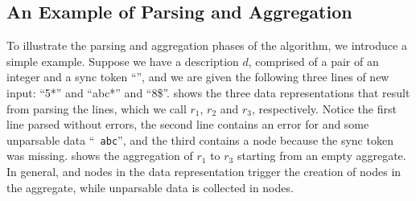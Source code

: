 





\subsection{An Example of Parsing and Aggregation}
To illustrate the parsing and aggregation phases of the algorithm, we
introduce a simple example.
Suppose we have a description $d$, comprised of a pair of an integer and a sync token ``\cd{*}'',
and we are given the following three lines of new input: ``5*'' and
``abc*'' and ``8\$''.
 shows the three data representations that result
from parsing the lines, which we call $r_1$, $r_2$ and $r_3$,
respectively. Notice the first line parsed without errors, the second
line contains an error for  and some unparsable data ``{\tt
  abc}'', and the third contains a  node because the
sync token \cd{*} was missing.   shows the aggregation
of $r_1$ to $r_3$ starting from an empty aggregate. In
general,  and  nodes in the data representation
trigger the creation of  nodes in the aggregate, while
unparsable data is collected in  nodes.


